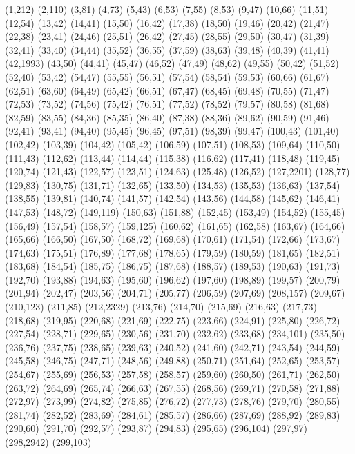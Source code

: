 (1,212)
(2,110)
(3,81)
(4,73)
(5,43)
(6,53)
(7,55)
(8,53)
(9,47)
(10,66)
(11,51)
(12,54)
(13,42)
(14,41)
(15,50)
(16,42)
(17,38)
(18,50)
(19,46)
(20,42)
(21,47)
(22,38)
(23,41)
(24,46)
(25,51)
(26,42)
(27,45)
(28,55)
(29,50)
(30,47)
(31,39)
(32,41)
(33,40)
(34,44)
(35,52)
(36,55)
(37,59)
(38,63)
(39,48)
(40,39)
(41,41)
(42,1993)
(43,50)
(44,41)
(45,47)
(46,52)
(47,49)
(48,62)
(49,55)
(50,42)
(51,52)
(52,40)
(53,42)
(54,47)
(55,55)
(56,51)
(57,54)
(58,54)
(59,53)
(60,66)
(61,67)
(62,51)
(63,60)
(64,49)
(65,42)
(66,51)
(67,47)
(68,45)
(69,48)
(70,55)
(71,47)
(72,53)
(73,52)
(74,56)
(75,42)
(76,51)
(77,52)
(78,52)
(79,57)
(80,58)
(81,68)
(82,59)
(83,55)
(84,36)
(85,35)
(86,40)
(87,38)
(88,36)
(89,62)
(90,59)
(91,46)
(92,41)
(93,41)
(94,40)
(95,45)
(96,45)
(97,51)
(98,39)
(99,47)
(100,43)
(101,40)
(102,42)
(103,39)
(104,42)
(105,42)
(106,59)
(107,51)
(108,53)
(109,64)
(110,50)
(111,43)
(112,62)
(113,44)
(114,44)
(115,38)
(116,62)
(117,41)
(118,48)
(119,45)
(120,74)
(121,43)
(122,57)
(123,51)
(124,63)
(125,48)
(126,52)
(127,2201)
(128,77)
(129,83)
(130,75)
(131,71)
(132,65)
(133,50)
(134,53)
(135,53)
(136,63)
(137,54)
(138,55)
(139,81)
(140,74)
(141,57)
(142,54)
(143,56)
(144,58)
(145,62)
(146,41)
(147,53)
(148,72)
(149,119)
(150,63)
(151,88)
(152,45)
(153,49)
(154,52)
(155,45)
(156,49)
(157,54)
(158,57)
(159,125)
(160,62)
(161,65)
(162,58)
(163,67)
(164,66)
(165,66)
(166,50)
(167,50)
(168,72)
(169,68)
(170,61)
(171,54)
(172,66)
(173,67)
(174,63)
(175,51)
(176,89)
(177,68)
(178,65)
(179,59)
(180,59)
(181,65)
(182,51)
(183,68)
(184,54)
(185,75)
(186,75)
(187,68)
(188,57)
(189,53)
(190,63)
(191,73)
(192,70)
(193,88)
(194,63)
(195,60)
(196,62)
(197,60)
(198,89)
(199,57)
(200,79)
(201,94)
(202,47)
(203,56)
(204,71)
(205,77)
(206,59)
(207,69)
(208,157)
(209,67)
(210,123)
(211,85)
(212,2329)
(213,76)
(214,70)
(215,69)
(216,63)
(217,73)
(218,68)
(219,95)
(220,68)
(221,69)
(222,75)
(223,66)
(224,91)
(225,80)
(226,72)
(227,54)
(228,71)
(229,65)
(230,56)
(231,70)
(232,62)
(233,68)
(234,101)
(235,50)
(236,76)
(237,75)
(238,65)
(239,63)
(240,52)
(241,60)
(242,71)
(243,54)
(244,59)
(245,58)
(246,75)
(247,71)
(248,56)
(249,88)
(250,71)
(251,64)
(252,65)
(253,57)
(254,67)
(255,69)
(256,53)
(257,58)
(258,57)
(259,60)
(260,50)
(261,71)
(262,50)
(263,72)
(264,69)
(265,74)
(266,63)
(267,55)
(268,56)
(269,71)
(270,58)
(271,88)
(272,97)
(273,99)
(274,82)
(275,85)
(276,72)
(277,73)
(278,76)
(279,70)
(280,55)
(281,74)
(282,52)
(283,69)
(284,61)
(285,57)
(286,66)
(287,69)
(288,92)
(289,83)
(290,60)
(291,70)
(292,57)
(293,87)
(294,83)
(295,65)
(296,104)
(297,97)
(298,2942)
(299,103)
